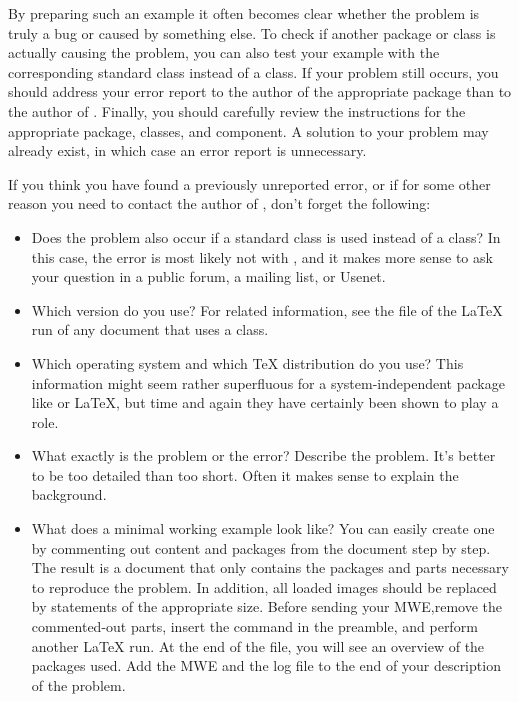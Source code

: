 By preparing such an example it often becomes clear whether the problem is
truly a {\KOMAScript} bug or caused by something else. To check if another
package or class is actually causing the problem, you can also test your
example with the corresponding standard class instead of a {\KOMAScript}
class. If your problem still occurs, you should address your error report to
the author of the appropriate package than to the author of {\KOMAScript}.
Finally, you should carefully review the instructions for the appropriate
package, classes, and {\KOMAScript} component. A solution to your problem may
already exist, in which case an error report is unnecessary.

If you think you have found a previously unreported error, or if for some
other reason you need to contact the author of {\KOMAScript}, don't forget the
following:

\begin{itemize}
\item Does the problem also occur if a standard class is used instead of a
  {\KOMAScript} class? In this case, the error is most likely not with
  {\KOMAScript}, and it makes more sense to ask your question in a public
  forum, a mailing list, or Usenet.
\item Which {\KOMAScript} version do you use? For related information, see the
   file of the \LaTeX{} run of any document that uses a
  {\KOMAScript} class.
\item Which operating system and which \TeX{} distribution do you use? This
  information might seem rather superfluous for a system-independent package
  like {\KOMAScript} or {\LaTeX}, but time and again they have certainly been
  shown to play a role.
\item What exactly is the problem or the error? Describe the problem. It's
  better to be too detailed than too short. Often it makes sense to explain
  the background.
\item What does a minimal working example look like? You can easily create one
  by commenting out content and packages from the document step by step.  The
  result is a document that only contains the packages and parts necessary to
  reproduce the problem. In addition, all loaded images should be replaced by
   statements of the appropriate size. Before sending your
  MWE,remove the commented-out parts, insert the command  in
  the preamble, and perform another {\LaTeX} run. At the end of the 
  file, you will see an overview of the packages used. Add the MWE and the log
  file to the end of your description of the problem.
\end{itemize}

